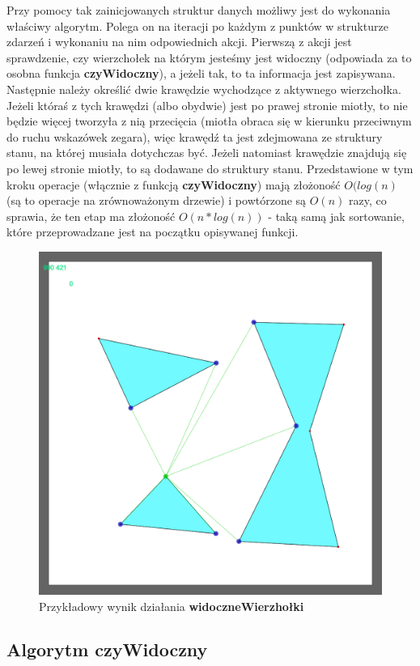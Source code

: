 \documentclass{article}
\begin{document}
\noindent \qquad Przy pomocy tak zainicjowanych struktur danych możliwy jest do wykonania właściwy algorytm. Polega on na iteracji po każdym z punktów w strukturze zdarzeń i wykonaniu na nim odpowiednich akcji. Pierwszą z akcji jest sprawdzenie, czy wierzchołek na którym jesteśmy jest widoczny (odpowiada za to osobna funkcja \textbf{czyWidoczny}), a jeżeli tak, to ta informacja jest zapisywana. Następnie należy określić dwie krawędzie wychodzące z aktywnego wierzchołka. Jeżeli któraś z tych krawędzi (albo obydwie) jest po prawej stronie miotły, to nie będzie więcej tworzyła z nią przecięcia (miotła obraca się w kierunku przeciwnym do ruchu wskazówek zegara), więc krawędź ta jest zdejmowana ze struktury stanu, na której musiała dotychczas być. Jeżeli natomiast krawędzie znajdują się po lewej stronie miotły, to są dodawane do struktury stanu. Przedstawione w tym kroku operacje (włącznie z funkcją \textbf{czyWidoczny}) mają złożoność $O(log(n)$ (są to operacje na zrównoważonym drzewie) i powtórzone są $O(n)$ razy, co sprawia, że ten etap ma złożoność $O(n*log(n))$ - taką samą jak sortowanie, które przeprowadzane jest na początku opisywanej funkcji.

\begin{figure}[ht]
\centering
\caption{Przykładowy wynik działania \textbf{widoczneWierzhołki}}
\includegraphics[width=0.5\linewidth]{rys2.png}
\end{figure} 

\subsection{Algorytm \textbf{czyWidoczny}}
\end{document}
